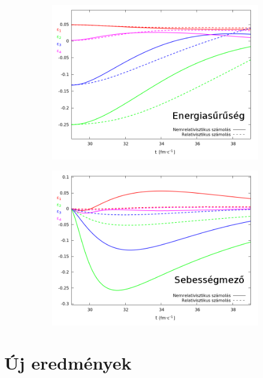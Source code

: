 \documentclass{beamer}
\begin{document}
\begin{frame}
\begin{center}
\begin{itemize}
\end{itemize}
\begin{figure}[H]
	\centering
    \begin{subfigure}[b]{0.49\textwidth}
    		\includegraphics[width=\textwidth]{pic/res/relnonrel_e}
	\end{subfigure}
	\begin{subfigure}[b]{0.49\textwidth}
        	\includegraphics[width=\textwidth]{pic/res/relnonrel_v}
	\end{subfigure}
\end{figure}
\end{center}
\end{frame}

\section{Új eredmények}
\end{document}
